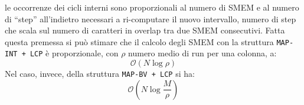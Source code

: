 le occorrenze dei cicli interni sono proporzionali al numero di SMEM e al numero
di ``step'' all'indietro necessari a ri-computare il nuovo intervallo, numero di
step che scala sul numero di caratteri in overlap tra due SMEM
consecutivi. Fatta questa premessa si può stimare che il calcolo degli SMEM con
la struttura \texttt{MAP-INT + LCP} è proporzionale, con $\rho$ numero medio di
run per una colonna, a:
\begin{equation}
  \label{eq:lcpmatchint}
  \mathcal{O}(N\log \rho)
\end{equation}
Nel caso, invece, della struttura \texttt{MAP-BV + LCP} si ha:
\begin{equation}
  \label{eq:lcpmatchbv}
  \mathcal{O}\left(N\log\frac{M}{\rho}\right)
\end{equation}

